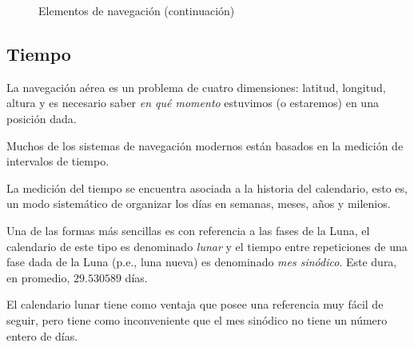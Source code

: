 \begin{figure}[!h]
  \centering
  \caption{Elementos de navegaci\'on (continuaci\'on)}
\end{figure}

\subsection{Tiempo}
\label{sec:tiempo}

La navegaci\'on a\'erea es un problema de cuatro dimensiones: latitud, longitud, altura y es necesario saber \emph{en qu\'e momento} estuvimos (o estaremos) en una posici\'on dada.

Muchos de los sistemas de navegaci\'on modernos est\'an basados en la medici\'on de intervalos de tiempo.

La medici\'on del tiempo se encuentra asociada a la historia del calendario, esto es, un modo sistem\'atico de organizar los d\'ias en semanas, meses, a\~nos y milenios.

Una de las formas m\'as sencillas es con referencia a las fases de la Luna, el calendario de este tipo es denominado \emph{lunar} y el tiempo entre repeticiones de una fase dada de la Luna (p.e., luna nueva) es denominado \emph{mes sin\'odico}. Este dura, en promedio, $29.530589$ d\'ias.

El calendario lunar tiene como ventaja que posee una referencia muy f\'acil de seguir, pero tiene como inconveniente que el mes sin\'odico no tiene un n\'umero entero de d\'ias.

